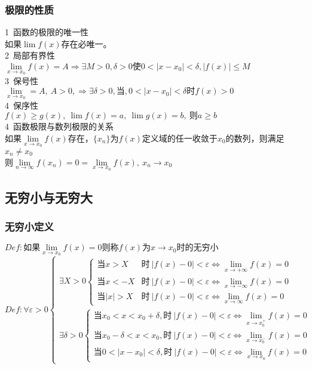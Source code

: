 \subsubsection{极限的性质}
1\ 函数的极限的唯一性\\
如果$\lim f(x)$存在必唯一。\\
2\ 局部有界性\\
$\lim\limits_{x\to x_0}f(x)=A\Rightarrow\exists M>0,\delta >0\mbox{使}0<\left|x-x_0\right|<\delta,\left|f(x)\right|\leqslant M$\\
3\ 保号性\\
$\lim\limits_{x\to x_0}=A,\ A>0,\Rightarrow \exists \delta >0,\mbox{当},0<\left|x-x_0\right|<\delta\mbox{时}f(x)>0$\\
4\ 保序性\\
$f(x)\geqslant g(x),\ \lim f(x)=a,\ \lim g(x) = b,\ \mbox{则}a\geqslant b$\\
4\ 函数极限与数列极限的关系\\
如果$\lim\limits_{x\to x_0}f(x)$存在，$\{x_n\}$为$f(x)$定义域的任一收敛于$x_0$的数列，则满足$x_n\neq x_0$\\
则$\lim\limits_{n\to \infty}f(x_n)=0=\lim\limits_{x\to x_0}f(x),\ x_n\rightarrow x_0$

\subsection{无穷小与无穷大}
\subsubsection{无穷小定义}
$Def:\mbox{如果}\lim\limits_{x\to x_0}f(x)= 0\mbox{则称}f(x)\mbox{为}x\rightarrow x_0\mbox{时的无穷小}$\\
$Def: \forall \varepsilon >0\begin{cases}\exists X>0\begin{cases}
        \mbox{当}x>X&\mbox{时}\ \left|f(x)-0\right|<\varepsilon \Leftrightarrow \lim\limits_{x\to +\infty}f(x)=0\\
        \mbox{当}x<-X&\mbox{时}\ \left|f(x)-0\right|<\varepsilon \Leftrightarrow \lim\limits_{x\to -\infty}f(x)=0\\
        \mbox{当}\left|x\right|>X&\mbox{时}\ \left|f(x)-0\right|<\varepsilon \Leftrightarrow \lim\limits_{x\to \infty}f(x)=0
    \end{cases}\\
    \exists\delta>0\begin{cases}
        \mbox{当}x_0<x<x_0+\delta,\mbox{时}\ \left|f(x)-0\right|<\varepsilon\Leftrightarrow\lim\limits_{x\to x_0^+}f(x)=0\\
        \mbox{当}x_0-\delta<x<x_0 ,\mbox{时}\ \left|f(x)-0\right|<\varepsilon\Leftrightarrow\lim\limits_{x\to x_0^-}f(x)=0\\
        \mbox{当}0<\left|x-x_0\right|<\delta,\mbox{时}\ \left|f(x)-0\right|<\varepsilon\Leftrightarrow\lim\limits_{x\to x_0}f(x)=0
    \end{cases}
\end{cases}$
